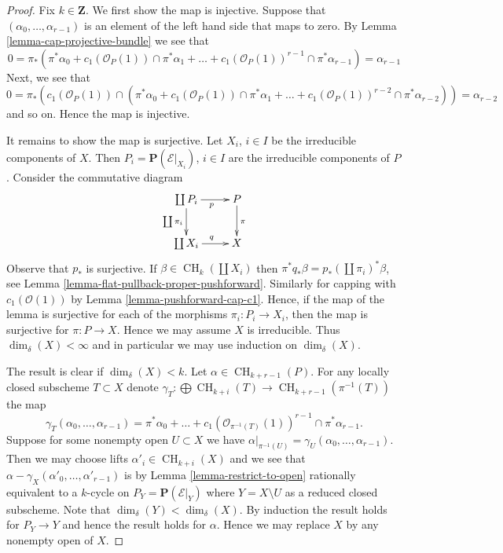 \documentclass[10pt,a4paper]{amsart}
\theoremstyle{plain}
\theoremstyle{definition}
\theoremstyle{remark}
\numberwithin{equation}{subsection}
\def\CH{\mathop{\mathrm{CH}}\nolimits}
\begin{document}
\begin{proof}
Fix $k \in \mathbf{Z}$. We first show the map is injective.
Suppose that $(\alpha_0, \ldots, \alpha_{r - 1})$ is an element
of the left hand side that maps to zero.
By Lemma \ref{lemma-cap-projective-bundle} we see that
$$
0 = \pi_*(\pi^*\alpha_0 +
c_1(\mathcal{O}_P(1)) \cap \pi^*\alpha_1
+ \ldots +
c_1(\mathcal{O}_P(1))^{r - 1} \cap \pi^*\alpha_{r-1})
= \alpha_{r - 1}
$$
Next, we see that
$$
0 = \pi_*(c_1(\mathcal{O}_P(1)) \cap (\pi^*\alpha_0 +
c_1(\mathcal{O}_P(1)) \cap \pi^*\alpha_1
+ \ldots +
c_1(\mathcal{O}_P(1))^{r - 2} \cap \pi^*\alpha_{r - 2}))
= \alpha_{r - 2}
$$
and so on. Hence the map is injective.

\medskip\noindent
It remains to show the map is surjective.
Let $X_i$, $i \in I$ be the irreducible components of $X$.
Then $P_i = \mathbf{P}(\mathcal{E}|_{X_i})$, $i \in I$
are the irreducible components of $P$. Consider the commutative
diagram
$$
\xymatrix{
\coprod P_i \ar[d]_{\coprod \pi_i} \ar[r]_p & P \ar[d]^\pi \\
\coprod X_i \ar[r]^q & X
}
$$
Observe that $p_*$ is surjective. If $\beta \in \CH_k(\coprod X_i)$
then $\pi^* q_* \beta = p_*(\coprod \pi_i)^* \beta$, see
Lemma \ref{lemma-flat-pullback-proper-pushforward}. Similarly for
capping with $c_1(\mathcal{O}(1))$ by
Lemma \ref{lemma-pushforward-cap-c1}.
Hence, if the map of the lemma is surjective for each
of the morphisms $\pi_i : P_i \to X_i$, then the map is
surjective for $\pi : P \to X$. Hence we may assume $X$ is irreducible.
Thus $\dim_\delta(X) < \infty$ and in particular we may use
induction on $\dim_\delta(X)$.

\medskip\noindent
The result is clear if $\dim_\delta(X) < k$.
Let $\alpha \in \CH_{k + r - 1}(P)$.
For any locally closed subscheme $T \subset X$ denote
$\gamma_T : \bigoplus \CH_{k + i}(T) \to \CH_{k + r - 1}(\pi^{-1}(T))$
the map
$$
\gamma_T(\alpha_0, \ldots, \alpha_{r - 1})
= \pi^*\alpha_0 + \ldots +
c_1(\mathcal{O}_{\pi^{-1}(T)}(1))^{r - 1} \cap \pi^*\alpha_{r - 1}.
$$
Suppose for some nonempty open $U \subset X$ we have
$\alpha|_{\pi^{-1}(U)} = \gamma_U(\alpha_0, \ldots, \alpha_{r - 1})$.
Then we may choose lifts $\alpha'_i \in \CH_{k + i}(X)$ and we
see that $\alpha - \gamma_X(\alpha'_0, \ldots, \alpha'_{r - 1})$
is by Lemma \ref{lemma-restrict-to-open}
rationally equivalent to a $k$-cycle on $P_Y = \mathbf{P}(\mathcal{E}|_Y)$
where $Y = X \setminus U$ as a reduced closed subscheme.
Note that $\dim_\delta(Y) < \dim_\delta(X)$.
By induction the result holds
for $P_Y \to Y$ and hence the result holds for $\alpha$.
Hence we may replace $X$ by any nonempty open of $X$.


\end{proof}
\end{document}
